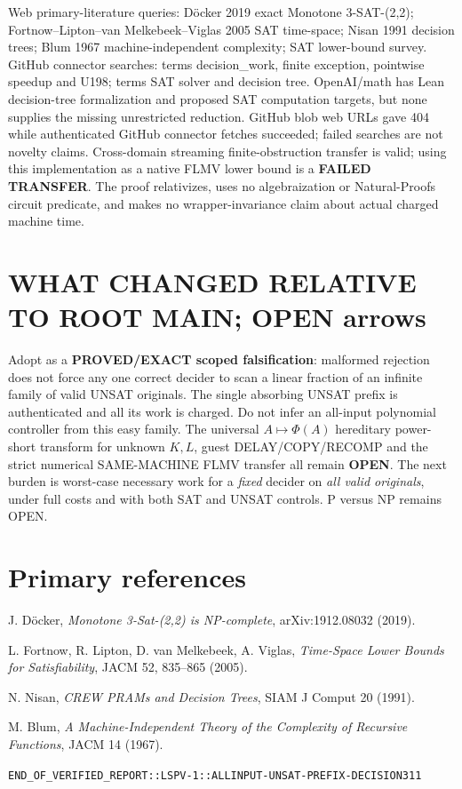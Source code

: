 \documentclass[11pt]{article}
\begin{document}
Web primary-literature queries: D\"ocker 2019 exact Monotone
3-SAT-(2,2); Fortnow--Lipton--van Melkebeek--Viglas 2005
SAT time-space; Nisan 1991 decision trees; Blum 1967 machine-independent
complexity; SAT lower-bound survey. GitHub connector searches:
 terms decision_work, finite exception, pointwise
speedup and U198;  terms SAT solver and
decision tree. OpenAI/math has Lean decision-tree formalization and
proposed SAT computation targets, but none supplies the missing
unrestricted reduction. GitHub blob web URLs gave 404 while authenticated
GitHub connector fetches succeeded; failed searches are not novelty
claims. Cross-domain streaming finite-obstruction transfer is valid;
using this implementation as a native FLMV lower bound is a
\textbf{FAILED TRANSFER}. The proof relativizes, uses no algebraization
or Natural-Proofs circuit predicate, and makes no wrapper-invariance
claim about actual charged machine time.

\section{WHAT CHANGED RELATIVE TO ROOT MAIN; OPEN arrows}
Adopt as a \textbf{PROVED/EXACT scoped falsification}:
malformed rejection does not force any one correct decider to scan a
linear fraction of an infinite family of valid UNSAT originals.
The single absorbing UNSAT prefix is authenticated and all its work
is charged. Do not infer an all-input polynomial controller from this
easy family. The universal $A\mapsto\Phi(A)$ hereditary power-short
transform for unknown $K,L$, guest DELAY/COPY/RECOMP and the strict
numerical SAME-MACHINE FLMV transfer all remain \textbf{OPEN}.
The next burden is worst-case necessary work for a \emph{fixed}
decider on \emph{all valid originals}, under full costs and with both
SAT and UNSAT controls. P versus NP remains OPEN.

\section{Primary references}
\noindent [1] J. D\"ocker, \emph{Monotone 3-Sat-(2,2) is NP-complete},
arXiv:1912.08032 (2019).\par
\noindent [2] L. Fortnow, R. Lipton, D. van Melkebeek, A. Viglas,
\emph{Time-Space Lower Bounds for Satisfiability}, JACM 52, 835--865 (2005).\par
\noindent [3] N. Nisan, \emph{CREW PRAMs and Decision Trees},
SIAM J Comput 20 (1991).\par
\noindent [4] M. Blum, \emph{A Machine-Independent Theory of the
Complexity of Recursive Functions}, JACM 14 (1967).\par
\noindent\texttt{END\_OF\_VERIFIED\_REPORT::LSPV-1::ALLINPUT-UNSAT-PREFIX-DECISION311}
\end{document}
